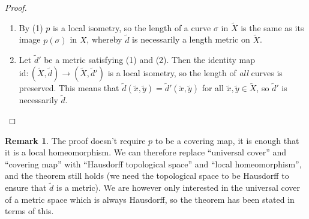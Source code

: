 \documentclass[11pt, a4paper, oneside]{memoir}
\theoremstyle{plain}\newtheorem{theorem}[subsection]{Theorem}
\theoremstyle{definition}
\newtheorem{remark}[subsection]{Remark}
\newcommand{\twiddle}[1]{\widetilde{#1}}
\begin{document}
\begin{proof}
\begin{enumerate}
In particular we have, \(\twiddle{d}(\twiddle{x},\twiddle{y})=d(x,y)<r\), so \(Y_x\subseteq B(\twiddle{x},r) := \{ \twiddle{y} \in \twiddle{U}_{x}  \; \vert \; \twiddle{d}(\twiddle{x},\twiddle{y}) < r\} \).
Left is to show that \(B(\twiddle{x},r)\subseteq Y_x\).
By the choice of \(r\) we have \(B(\twiddle{x},r)\subseteq B(\twiddle{x},3r)\subseteq \twiddle{U}_{\twiddle{x}}\), and as \(p:\twiddle{U}_{\twiddle{x}}\to U_x\) is a bijection we have \(s(z)=s(p(\twiddle{z}))=\twiddle{z}\in B(\twiddle{x},r)\) for any \(\twiddle{z}\in B(\twiddle{x},r)\) with \(z=p(\twiddle{z})\).
But we know \(z=p(\twiddle{z})\in B(x,r)\) as \(d(x,z)\leq\twiddle{d}(\twiddle{x},\twiddle{z})<r\), and as \(s|_{B(x,r)}:B(x,r)\to Y_x\) is a bijection we must have \(s(z)=\twiddle{z}\in Y_x\).
This in turn means that \(B(\twiddle{x},r)\subseteq Y_x\), whereby \(Y_x=B(\twiddle{x},r)\).

We have now shown that every \(\twiddle{x}\in \twiddle{X}\) has a neighborhood which is isometric to a neighborhood of \(x=p(\twiddle{x})\), proving (1).

    \item By (1) \(p\) is a local isometry, so the length of a curve \(\sigma\) in \(\twiddle{X}\) is the same as its image \(p(\sigma)\) in \(X\), whereby \(\twiddle{d}\) is necessarily a length metric on \(\twiddle{X}\).

    \item Let \(\twiddle{d}'\) be a metric satisfying (1) and (2).
Then the identity map \(\text{id}:(\twiddle{X},\twiddle{d})\to (\twiddle{X},\twiddle{d}')\) is a local isometry, so the length of \textit{all} curves is preserved.
This means that \(\twiddle{d}(\twiddle{x},\twiddle{y})=\twiddle{d}'(\twiddle{x},\twiddle{y})\) for all \(\twiddle{x},\twiddle{y}\in\twiddle{X}\), so \(\twiddle{d}'\) is necessarily \(\twiddle{d}\).
\end{enumerate}
\end{proof}
\begin{remark}
The proof doesn't require \(p\) to be a covering map, it is enough that it is a local homeomorphism.
We can therefore replace ``universal cover'' and ``covering map'' with ``Hausdorff topological space'' and ``local homeomorphism'', and the theorem still holds (we need the topological space to be Hausdorff to ensure that \(\twiddle{d}\) is a metric).
We are however only interested in the universal cover of a metric space which is always Hausdorff, so the theorem has been stated in terms of this.
\end{remark}
\end{document}
